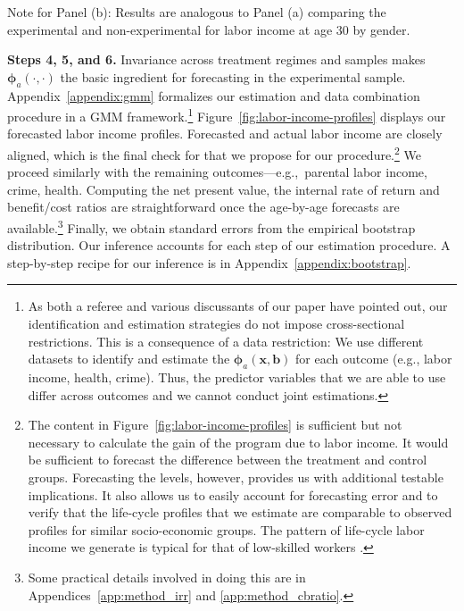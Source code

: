 \begin{table}[!htpb]
\begin{threeparttable}
\begin{tablenotes}
\item Note for Panel (b): Results are analogous to Panel (a) comparing the experimental and non-experimental for labor income at age 30 by gender.
\end{tablenotes}
\end{threeparttable}
\end{table}

\noindent \textbf{Steps 4, 5, and 6.} \label{section:following} Invariance across treatment regimes and samples makes $\bm{\phi}_{a} (\cdot, \cdot)$ the basic ingredient for forecasting in the experimental sample. Appendix~\ref{appendix:gmm} formalizes our estimation and data combination procedure in a GMM framework.\footnote{As both a referee and various discussants of our paper have pointed out, our identification and estimation strategies do not impose cross-sectional restrictions. This is a consequence of a data restriction: We use different datasets to identify and estimate the  $\bm{\phi}_{a} \left( \bm{x}, \bm{b} \right)$ for each outcome (e.g., labor income, health, crime). Thus, the predictor variables that we are able to use differ across outcomes and we cannot conduct joint estimations.} Figure~\ref{fig:labor-income-profiles} displays our forecasted labor income profiles. Forecasted and actual labor income are closely aligned, which is the final check for that we propose for our procedure.\footnote{The content in Figure~\ref{fig:labor-income-profiles} is sufficient but not necessary to calculate the gain of the program due to labor income. It would be sufficient to forecast the difference between the treatment and control groups. Forecasting the levels, however, provides us with additional testable implications. It also allows us to easily account for forecasting error and to verify that the life-cycle profiles that we estimate are comparable to observed profiles for similar socio-economic groups. The pattern of life-cycle labor income we generate is typical for that of low-skilled workers \citep{Blundell-etal_2015_J-Pub-E,Gladden_Taber_2000_WageProgression,Sanders-Taber_2012_AR,Lagakos_Moll_etal_2016_LifeCycle_NBER}.} We proceed similarly with the remaining outcomes---e.g.,\ parental labor income, crime, health. Computing the net present value, the internal rate of return and benefit/cost ratios are straightforward once the age-by-age forecasts are available.\footnote{Some practical details involved in doing this are in Appendices~\ref{app:method_irr} and \ref{app:method_cbratio}.} Finally, we obtain standard errors from the empirical bootstrap distribution. Our inference accounts for each step of our estimation procedure. A step-by-step recipe for our inference is in Appendix~\ref{appendix:bootstrap}.

